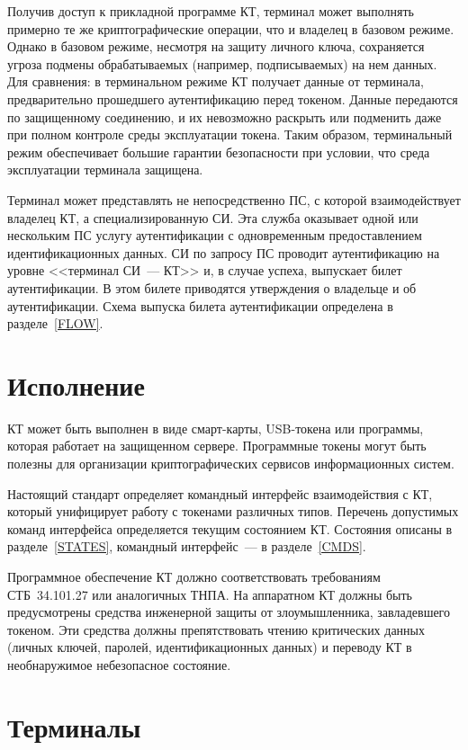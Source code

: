 Получив доступ к прикладной программе КТ, терминал может выполнять примерно те 
же криптографические операции, что и владелец в базовом режиме. Однако в 
базовом режиме, несмотря на защиту личного ключа, сохраняется угроза подмены 
обрабатываемых (например, подписываемых) на нем данных. Для сравнения: в 
терминальном режиме КТ получает данные от терминала, предварительно прошедшего 
аутентификацию перед токеном. Данные передаются по защищенному соединению, и их 
невозможно раскрыть или подменить даже при полном контроле среды эксплуатации 
токена. Таким образом, терминальный режим обеспечивает большие гарантии 
безопасности при условии, что среда эксплуатации терминала защищена.

Терминал может представлять не непосредственно ПС, с которой взаимодействует 
владелец КТ, а специализированную СИ. Эта служба оказывает одной или 
нескольким ПС услугу аутентификации с одновременным предоставлением 
идентификационных данных.
%
СИ по запросу ПС проводит аутентификацию на уровне 
<<терминал СИ~--- КТ>> и, в случае успеха, выпускает билет аутентификации. В 
этом билете приводятся утверждения о владельце и об аутентификации. 
Схема выпуска билета аутентификации определена в разделе~\ref{FLOW}.

\section{Исполнение} 

КТ может быть выполнен в виде смарт-карты, USB-токена 
или программы, которая работает на защищенном сервере. 
Программные токены могут быть полезны для организации криптографических 
сервисов информационных систем. 

Настоящий стандарт определяет командный интерфейс взаимодействия с КТ, который
унифицирует работу с токенами различных типов.
%
Перечень допустимых команд интерфейса определяется текущим состоянием КТ.
%
Состояния описаны в разделе~\ref{STATES}, командный интерфейс~--- в 
разделе~\ref{CMDS}.

Программное обеспечение КТ должно соответствовать требованиям СТБ~34.101.27  или
аналогичных ТНПА. На аппаратном КТ должны быть предусмотрены средства инженерной
защиты от злоумышленника, завладевшего токеном. Эти средства должны
препятствовать чтению критических данных (личных ключей, паролей,
идентификационных данных) и переводу КТ в необнаружимое небезопасное состояние.

\section{Терминалы}

